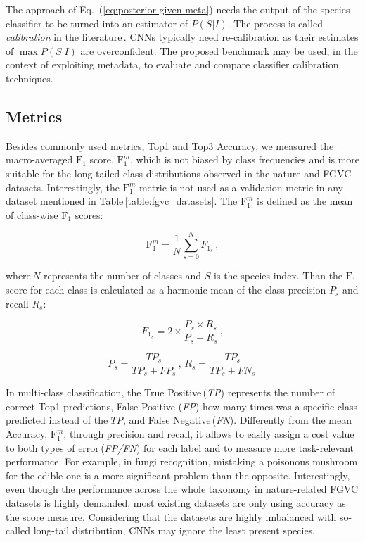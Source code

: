 \documentclass[10pt,twocolumn,letterpaper]{article}
\begin{document}
The approach of Eq.~(\ref{eq:posterior-given-meta}) needs
the output of the species classifier to be turned into an estimator of $P(S|I)$. The process is called {\it calibration} in the literature\,\cite{guo2017calibration,vaicenavicius2019evaluating}.
CNNs typically need re-calibration as their estimates of $\max P(S|I)$ are overconfident.
The proposed benchmark may be used, in the context of exploiting metadata, to evaluate and compare classifier calibration techniques.

\subsection{Metrics}
\label{metrics}

Besides commonly used metrics, Top1 and Top3 Accuracy, we measured the macro-averaged $\text{F}_1$ score, $\text{F}_{1}^{m}$, which is not biased by class frequencies and is more suitable for the long-tailed class distributions observed in the nature and FGVC datasets. Interestingly, the $\text{F}_{1}^{m}$ metric is not used as a validation metric in any dataset mentioned in Table\,\ref{table:fgvc_datasets}. The $\text{F}_{1}^{m}$ is defined as the mean of class-wise $\text{F}_1$ scores:

\begin{equation}
\text{F}_{1}^{m} = \frac{1}{N} \sum_{s=0}^{N} F_{1_{s}}\,,
\label{eq:F1_macro}
\end{equation}

where\,$N$ represents the number of classes and $S$ is the species index. Than the $\text{F}_1$ score for each class is calculated as a harmonic mean of the class precision $P_s$ and recall $R_s$:

\begin{equation}
F_{1_{s}} = 2 \times \frac{{P_s} \times {R_s}}{P_s + R_s}\,,
\label{eq:F1_i}
\end{equation}

\begin{equation}
P_s=\frac{TP_s}{TP_s+FP_s}\,,\,R_s=\frac{TP_s}{TP_s+FN_s}\,
\label{eq:precisionrecall}
\end{equation}

In multi-class classification, the True Positive\,(\textit{TP}) represents the number of correct Top1 predictions, False Positive (\textit{FP}) how many times was a specific class predicted instead of the\,\textit{TP}, and False Negative\,(\textit{FN}).
Differently from the mean Accuracy, $\text{F}_{1}^{m}$, through precision and recall, it allows to easily assign a cost value to both types of error\,(\textit{FP/FN}) for each label and to measure more task-relevant performance. For example, in fungi recognition, mistaking a poisonous mushroom for the edible one is a more significant problem than the opposite. Interestingly, even though the performance across the whole taxonomy in nature-related FGVC datasets is highly demanded, most existing datasets are only using accuracy as the score measure. Considering that the datasets are highly imbalanced with so-called long-tail distribution, CNNs may ignore the least present species.
\end{document}
